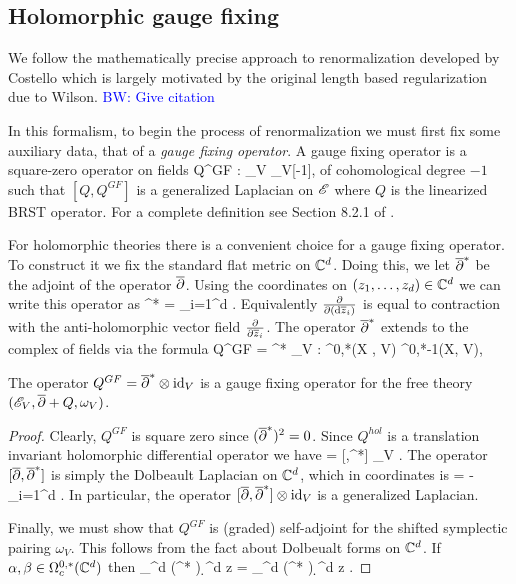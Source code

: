 \documentclass[10pt]{article}
\def\brian{\textcolor{blue}{BW: }\textcolor{blue}}
\begin{document}
\subsection{Holomorphic gauge fixing}

We follow the mathematically precise approach to renormalization developed by Costello \cite{CosRenorm} which is largely motivated by the original length based regularization due to Wilson. \brian{Give citation}
 
In this formalism, to begin the process of renormalization we must first fix some auxiliary data, that of a {\em gauge fixing operator}.
A gauge fixing operator is a square-zero operator on fields
\ben
Q^{GF} : \sE_V \to \sE_V[-1],
\een
of cohomological degree $-1$ such that $[Q, Q^{GF}]$ is a generalized Laplacian on $\mathscr E$ where $Q$ is the linearized BRST operator. 
For a complete definition see Section 8.2.1 of \cite{CG2}.

For holomorphic theories there is a convenient choice for a gauge fixing operator. 
To construct it we fix the standard flat metric on $\mathbb C^d$. 
Doing this, we let $\overline{\partial}^*$ be the adjoint of the operator $\overline{\partial}$.
Using the coordinates on $(z_1,\ldots, z_d) \in \mathbb C^d$ we can write this operator as
\ben
\dbar^* = \sum_{i=1}^d   .
\een
Equivalently $\frac{\partial}{\partial ({\rm d} \overline{z}_i)}$ is equal to contraction with the anti-holomorphic vector field $\frac{\partial}{\partial \overline{z}_i}$. 
The operator $\overline{\partial}^*$ extends to the complex of fields via the formula
\ben
Q^{GF} = \dbar^* _V : \Omega^{0,*}(X , V) \to \Omega^{0,*-1}(X, V),
\een

\begin{lem}
The operator $Q^{GF} = \overline{\partial}^* \otimes {\rm id}_V$ is a gauge fixing operator for the free theory $(\mathscr E_V, \overline{\partial} + Q, \omega_V)$.
\end{lem}
\begin{proof}
Clearly, $Q^{GF}$ is square zero since $(\overline{\partial}^*)^2 = 0$.
Since $Q^{hol}$ is a translation invariant holomorphic differential operator we have
 = [\dbar,\dbar^*] \tensor \id_{V} .
\een
The operator $[\overline{\partial},\overline{\partial}^*]$ is simply the Dolbeault Laplacian on $\mathbb C^d$, which 
in coordinates is
\ben
[\dbar,\dbar^*] = -\sum_{i=1}^d  .
\een
In particular, the operator $[\overline{\partial},\overline{\partial}^*] \otimes {\rm id}_{V}$ is a generalized Laplacian. 

Finally, we must show that $Q^{GF}$ is (graded) self-adjoint for the shifted symplectic pairing $\omega_V$. 
This follows from the fact about Dolbeualt forms on $\mathbb C^d$.
If $\alpha,\beta \in \Omega^{0,*}_c(\mathbb C^d)$ then
\ben 
\int_{\CC^d} (\dbar^* \alpha) \wedge \beta \wedge \d^d z = \pm \int_{\CC^d} \alpha \wedge (\dbar^* \beta) \wedge \d^d z .
\een
\end{proof}
\end{document}
